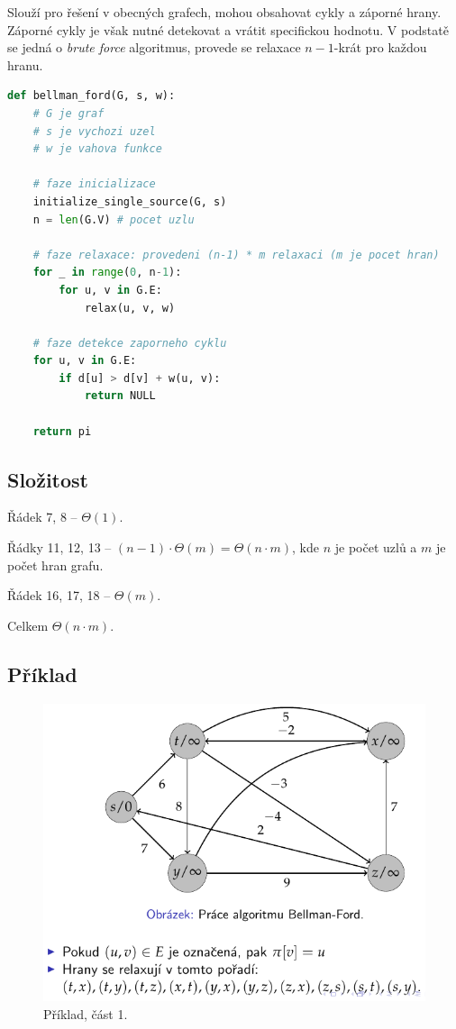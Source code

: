 Slouží pro řešení v obecných grafech, mohou obsahovat cykly a záporné hrany. Záporné cykly je však nutné detekovat a vrátit specifickou hodnotu. V podstatě se jedná o \textit{brute force} algoritmus, provede se relaxace $n-1$-krát pro každou hranu.

\bigskip\noindent\begin{minipage}{\linewidth}
\begin{lstlisting}[language=Python, caption={Algoritmus Bellman-Ford. Proč $n-1$ iterací? Protože mezi libovolnými dvěma uzly v grafu, existuje cesta o maximálním počtu hran $n-1$.}]
def bellman_ford(G, s, w):
    # G je graf
    # s je vychozi uzel
    # w je vahova funkce

    # faze inicializace
    initialize_single_source(G, s)
    n = len(G.V) # pocet uzlu

    # faze relaxace: provedeni (n-1) * m relaxaci (m je pocet hran)
    for _ in range(0, n-1):
        for u, v in G.E:
            relax(u, v, w)

    # faze detekce zaporneho cyklu
    for u, v in G.E:
        if d[u] > d[v] + w(u, v):
            return NULL

    return pi
\end{lstlisting}
\end{minipage}

\subsection{Složitost}

\begin{compactitem}
    \item Řádek 7, 8 -- $\Theta(1)$.
    \item Řádky 11, 12, 13 -- $(n-1) \cdot \Theta(m) = \Theta(n \cdot m)$, kde $n$ je počet uzlů a $m$ je počet hran grafu.
    \item Řádek 16, 17, 18 -- $\Theta(m)$.
    \item Celkem $\Theta(n \cdot m)$.
\end{compactitem}

\subsection{Příklad}

\begin{figure}[H]
    \centering
    \includegraphics[width=0.75\linewidth]{example_bellman_ford_p1.pdf}
    \caption{Příklad, část 1.}
\end{figure}

